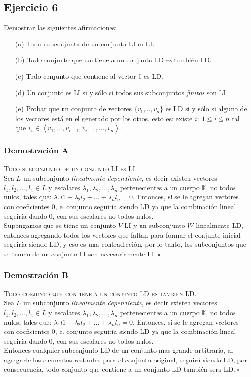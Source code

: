 \documentclass[a4paper,12pt]{article}
\begin{document}
\subsection{Ejercicio 6}
Demostrar las siguientes afirmaciones:
\begin{itemize}
    \item[(a)] Todo subconjunto de un conjunto LI es LI.
    \item[(b)] Todo conjunto que contiene a un conjunto LD es también LD.
    \item[(c)] Todo conjunto que contiene al vector 0 es LD.
    \item[(d)] Un conjunto es LI si y sólo si todos sus subconjuntos \textit{finitos} son LI
    \item[(e)] Probar que un conjunto de vectores $\{v_1,..,v_n\}$ es LD si y sólo si alguno de los vectores está en el generado por los otros, esto es: existe $i: \ 1\leq i\leq n $ tal que $v_i\in\left \langle v_1,...,v_{i-1},v_{i+1},...,v_n \right \rangle $.
\end{itemize}
\subsubsection{Demostración A}
\textsc{Todo subconjunto de un conjunto LI es LI} \\
Sea $L$ un subconjunto \textit{linealmente dependiente}, es decir existen vectores $l_1,l_2,...,l_n\in L$ y escalares $\lambda_1,\lambda_2,...,\lambda_n$ pertenecientes a un cuerpo $\mathds{K}$, no todos nulos, tales que: $\lambda_1l1+\lambda_2l_2+...+\lambda_nl_n=0$. Entonces, si se le agregan vectores con coeficientes 0, el conjunto seguiría siendo LD ya que la combinación lineal seguiría dando 0, con sus escalares no todos nulos. \\
Supongamos que se tiene un conjunto $V$ LI y un subconjunto $W$ linealmente LD, entonces agregando todos los vectores que faltan para formar el conjunto inicial seguiría siendo LD, y eso es una contradicción, por lo tanto, los subconjuntos que se tomen de un conjunto LI son necesariamente LI. $\square$
\subsubsection{Demostración B}
\textsc{Todo conjunto que contiene a un conjunto LD es tambien LD}. \\
Sea $L$ un subconjunto \textit{linealmente dependiente}, es decir existen vectores $l_1,l_2,...,l_n\in L$ y escalares $\lambda_1,\lambda_2,...,\lambda_n$ pertenecientes a un cuerpo $\mathds{K}$, no todos nulos, tales que: $\lambda_1l1+\lambda_2l_2+...+\lambda_nl_n=0$. Entonces, si se le agregan vectores con coeficientes 0, el conjunto seguiría siendo LD ya que la combinación lineal seguiría dando 0, con sus escalares no todos nulos. \\
Entonces cualquier subconjunto LD de un conjunto mas grande arbitrario, al agregarle los elementos restantes para el conjunto original, seguirá siendo LD, por consecuencia, todo conjunto que contiene a un conjunto LD también será LD. $\square$
\end{document}
